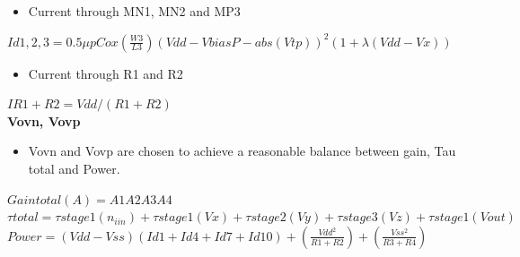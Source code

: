 \documentclass[12pt,a4paper]{article}
\begin{document}
\begin{itemize}
\item Current through MN1, MN2 and MP3
\end{itemize}
$Id1,2,3=0.5\mu pCox(\frac{W3}{L3})(Vdd-VbiasP-abs(Vtp))^{2} (1+\lambda 
(Vdd-Vx))$\\


\begin{itemize}
\item Current through R1 and R2
\end{itemize}
$IR1+R2=Vdd/(R1+R2)$\\


\textbf{Vovn, Vovp}

\begin{itemize}
\item Vovn and Vovp are chosen to achieve a reasonable balance between 
gain, Tau total and Power.
\end{itemize}
$Gain total (A)=A1A2A3A4$\\


$\tau total=\tau stage1(n_{iin})+\tau stage1(Vx)+\tau stage2(Vy)+\tau 
stage3(Vz)+\tau stage1 (Vout)$\\


$
Power=(Vdd-Vss)(Id1+Id4+Id7+Id10)+(\frac{Vdd^{2}}{R1+R2})+(\frac{Vss^{2}}{R3+R4}) 
$\\
\end{document}
